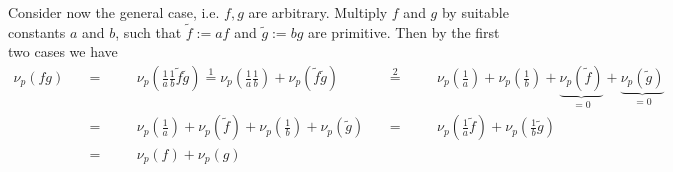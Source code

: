 \documentclass[12pt]{book}
\begin{document}
\begin{spacing}{1.3}
\begin{compactitem}
\item[\textbf{case 3}] Consider now the general case, i.e. $f,g$ are arbitrary.
Multiply $f$ and $g$ by suitable constants $a$ and $b$, such that $\tilde{f}:=af$ and $\tilde{g}:=bg$ are primitive. Then by the first two cases we have
\begin{alignat*}{8}
\nu_p(fg)\quad&=&&\quad \nu_p\left(\frac{1}{a}\frac{1}{b} \tilde{f} \tilde{g}\right) \overset{1}{=}\nu_p\left(\frac{1}{a} \frac{1}{b}\right) + \nu_p(\tilde{f} \tilde{g}) \ &&\overset{2}{=}&& \quad \nu_p\left(\frac{1}{a}\right)+ \nu_p\left(\frac{1}{b}\right)+ \underbrace{\nu_p(\tilde{f})}_{=0}+ \underbrace{\nu_p(\tilde{g})}_{=0}\\
&=&& \quad \nu_p\left(\frac{1}{a}\right)+\nu_p(\tilde{f})+ \nu_p\left(\frac{1}{b}\right)+ \nu_p(\tilde{g}) \ &&=&& \quad \nu_p\left(\frac{1}{a} \tilde{f}\right)+ \nu_p \left(\frac{1}{b} \tilde{g}\right)\\
&=&&  \quad\nu_p(f) + \nu_p(g)
\end{alignat*}
\end{compactitem}


\end{spacing}
\end{document}
